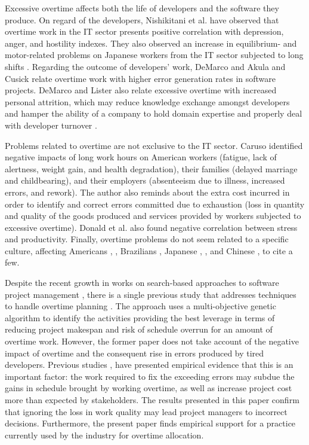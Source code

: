 \documentclass[conference]{IEEEtran}
\begin{document}
Excessive overtime affects both the life of developers and the software they produce. On regard of the developers, Nishikitani et al. \cite{NISHIKITANI:2005} have observed that overtime work in the IT sector presents positive correlation with depression, anger, and hostility indexes. They also observed an increase in equilibrium- and motor-related problems on Japanese workers from the IT sector subjected to long shifts \cite{karita:2006}. Regarding the outcome of developers' work, DeMarco \cite{demarco:1982} and Akula and Cusick \cite{akula:2008} relate overtime work with higher error generation rates in software projects. DeMarco and Lister  \cite{demarco:1999} also relate excessive overtime with increased personal attrition, which may reduce knowledge exchange amongst developers  \cite{Andreas:2005} and hamper the ability of a company to hold domain expertise and properly deal with developer turnover \cite{amin:2011}.

Problems related to overtime are not exclusive to the IT sector. Caruso \cite{caruso:2006} identified negative impacts of long work hours on American workers (fatigue, lack of alertness, weight gain, and health degradation), their families (delayed marriage and childbearing), and their employers (absenteeism due to illness, increased errors, and rework). The author also reminds about the extra cost incurred in order to identify and correct errors committed due to exhaustion (loss in quantity and quality of the goods produced and services provided by workers subjected to excessive overtime). Donald et al. \cite{Donald:2005} also found negative correlation between stress and productivity. Finally, overtime problems do not seem related to a specific culture, affecting Americans \cite{caruso:2006}, \cite{Dembe:2005}, Brazilians \cite{fischer:2000}, Japanese \cite{karita:2006}, \cite{Sasaki:2007}, and Chinese \cite{Houdmont:2011}, to cite a few.

Despite the recent growth in works on search-based approaches to software project management \cite{ferrucci:2014}, there is a single previous study that addresses techniques to handle overtime planning \cite{Ferrucci:2013}. The approach uses a multi-objective genetic algorithm to identify the activities providing the best leverage in terms of reducing project makespan and risk of schedule overrun for an amount of overtime work. However, the former paper does not take account of the negative impact of overtime and the consequent rise in errors produced by tired developers. Previous studies \cite{demarco:1982}, \cite{akula:2008} have presented empirical evidence that this is an important factor: the work required to fix the exceeding errors may subdue the gains in schedule brought by working overtime, as well as increase project cost more than expected by stakeholders. The results presented in this paper confirm that ignoring the loss in work quality may lead project managers to incorrect decisions. Furthermore, the present paper finds empirical support for a practice currently used by the industry for overtime allocation.
\end{document}
